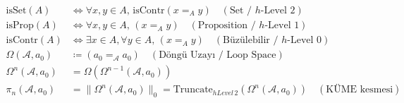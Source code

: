 \documentclass[11pt, a4paper]{article}
\begin{document}
\begin{align}
\text{isSet}(A) &\iff \forall x, y \in A, \, \text{isContr}(x =_A y) \quad (\text{Set / $h$-Level 2}) \\
\text{isProp}(A) &\iff \forall x, y \in A, \, (x =_A y) \quad (\text{Proposition / $h$-Level 1}) \\
\text{isContr}(A) &\iff \exists x \in A, \forall y \in A, \, (x =_A y) \quad (\text{Büzülebilir / $h$-Level 0}) \\
\Omega(\mathcal{A}, a_0) &\coloneqq (a_0 =_{\mathcal{A}} a_0) \quad (\text{Döngü Uzayı / Loop Space}) \\
\Omega^n(\mathcal{A}, a_0) &= \Omega(\Omega^{n-1}(\mathcal{A}, a_0)) \\
\pi_n(\mathcal{A}, a_0) &= \big\| \Omega^n(\mathcal{A}, a_0) \big\|_0 = \text{Truncate}_{hLevel\,2}(\Omega^n(\mathcal{A}, a_0)) \quad (\text{KÜME kesmesi})
\end{align}
\end{document}
